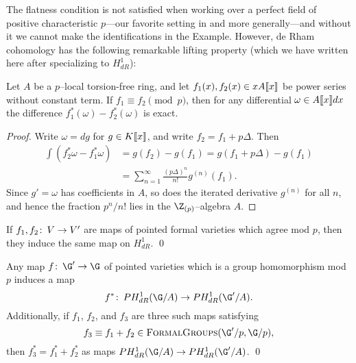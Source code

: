 
The flatness condition is not satisfied when working over a perfect field of positive characteristic \(p\)---our favorite setting in  and  more generally---and without it we cannot make the identifications in the Example.  However, de Rham cohomology has the following remarkable lifting property (which we have written here after specializing to \(H^1_{dR}\)):

\begin{theorem}
Let \(A\) be a \(p\)--local torsion-free ring, and let \(f_1(x), f_2(x) \in x A\llbracket{x}\rrbracket\) be power series without constant term.  If \(f_1 \equiv f_2 \pmod{p}\), then for any differential \(\omega \in A\llbracket{x}\rrbracket dx\) the difference \(f_1^*(\omega) - f_2^*(\omega)\) is exact.
\end{theorem}
\begin{proof}
Write \(\omega = dg\) for \(g \in K\llbracket{x}\rrbracket\), and write \(f_2 = f_1 + p\Delta\).  Then
\begin{align*}
\int \left( f_2^* \omega - f_1^* \omega \right) & = g(f_2) - g(f_1) = g(f_1 + p\Delta) - g(f_1) \\
& = \sum_{n = 1}^\infty \frac{(p\Delta)^n}{n!} g^{(n)}(f_1).
\end{align*}
Since \(g' = \omega\) has coefficients in \(A\), so does the iterated derivative \(g^{(n)}\) for all \(n\), and hence the fraction \(p^n/n!\) lies in the \(\Z_{(p)}\)--algebra \(A\).
\end{proof}

\begin{corollary}\label{H1dRIsCrystalline}
If \(f_1, f_2\colon\thinspace V \to V'\) are maps of pointed formal varieties which agree mod \(p\), then they induce the same map on \(H^1_{dR}\). \qed
\end{corollary}

\begin{corollary}
Any map \(f\co \G' \to \G\) of pointed varieties which is a group homomorphism mod \(p\) induces a map \[f^*\co PH^1_{dR}(\G/A) \to PH^1_{dR}(\G'/A).\]  Additionally, if \(f_1\), \(f_2\), and \(f_3\) are three such maps satisfying \[f_3 \equiv f_1 + f_2 \in \CatOf{FormalGroups}(\G'/p, \G/p),\] then \(f_3^* = f_1^* + f_2^*\) as maps \(PH^1_{dR}(\G/A) \to PH^1_{dR}(\G'/A)\). \qed
\end{corollary}

